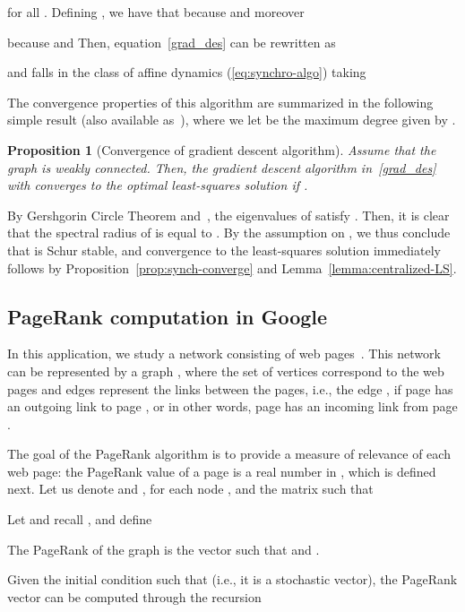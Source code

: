 \documentclass{IEEEtran}
\newtheorem{proposition}{Proposition}
\newcommand{\1}{\mathbf{1}} \newcommand{\ind}{\mathds{1}}
\begin{document}
for all .
Defining , we have that 
because  and moreover

because  and 
Then, equation~\eqref{grad_des} can be rewritten as

and falls in the class of affine dynamics
(\ref{eq:synchro-algo}) taking

The convergence properties of this algorithm are summarized in the following simple result (also available as~\cite[Proposition~1]{WSR-PF-FF:12}), where we let  be the maximum degree given by .
\begin{proposition}[Convergence of gradient descent algorithm]
Assume that the graph  is weakly connected. Then, the gradient descent algorithm in~\eqref{grad_des} with  converges to the optimal least-squares solution  if . \end{proposition}

\begin{IEEEproof}
By Gershgorin Circle Theorem and~\cite[Theorem~1.37]{FB-JC-SM:09}, the eigenvalues of  satisfy . 
Then, it is clear that the spectral radius of  is equal to . 
By the assumption on , we thus conclude that  is Schur stable, and convergence to the least-squares solution immediately follows by Proposition~\ref{prop:synch-converge} and Lemma~\ref{lemma:centralized-LS}.
\end{IEEEproof}


\subsection{PageRank computation in Google}

In this application, we study a network consisting of web pages~\cite{SB-LP:98}. This network can be represented by a graph , where the set of vertices correspond to the web pages and edges represent the links between the pages, i.e., the edge , if page  has an outgoing link to page , or in other words, page  has
an incoming link from page . 

The goal of the PageRank algorithm is to provide a measure of relevance of each web page: the PageRank value of a page is a real number in , which is defined next.
Let us denote  and , for each node , and  the matrix such that 

Let  and recall , and define 
 
The PageRank of the graph  is the vector  such that  and .

Given the initial condition such that  (i.e., it is a stochastic vector), the PageRank vector can be computed through the recursion
\end{document}
